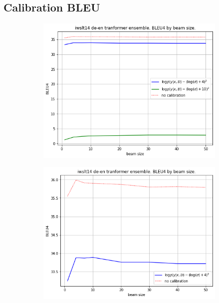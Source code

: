 \documentclass[a4paper,14pt]{extarticle}
\begin{document}
\subsection{Calibration BLEU}
	\begin{figure}[H]
		\begin{subfigure}{.5\textwidth}
			\includegraphics[width=\textwidth]{images/calibratin_bleu_all.png}
			\center{\caption{}}
		\end{subfigure}
		\begin{subfigure}{.5\textwidth}
			\includegraphics[width=\textwidth]{images/calibration_bleu_best.png}
			\center{\caption{}}
		\end{subfigure}
	\end{figure}
	
\end{document}
